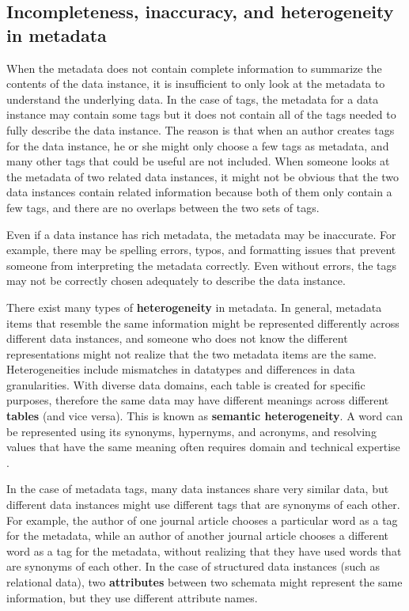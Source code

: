 \subsection{Incompleteness, inaccuracy, and heterogeneity in metadata}

When the metadata does not contain complete information to summarize the contents of the data instance, it is insufficient to only look at the metadata to understand the underlying data. In the case of tags, the metadata for a data instance may contain some tags but it does not contain all of the tags needed to fully describe the data instance. The reason is that when an author creates tags for the data instance, he or she might only choose a few tags as metadata, and many other tags that could be useful are not included. When someone looks at the metadata of two related data instances, it might not be obvious that the two data instances contain related information because both of them only contain a few tags, and there are no overlaps between the two sets of tags.

Even if a data instance has rich metadata, the metadata may be inaccurate. For example, there may be spelling errors, typos, and formatting issues that prevent someone from interpreting the metadata correctly. Even without errors, the tags may not be correctly chosen adequately to describe the data instance.

There exist many types of \textbf{\gls{heterogeneity}} in metadata. In general, metadata items that resemble the same information might be represented differently across different data instances, and someone who does not know the different representations might not realize that the two metadata items are the same. Heterogeneities include mismatches in datatypes and differences in data granularities. With diverse data domains, each table is created for specific purposes, therefore the same data may have different meanings across different \textbf{\glspl{table}} (and vice versa). This is known as \textbf{\gls{semantic heterogeneity}}. A word can be represented using its synonyms, hypernyms, and acronyms, and resolving values that have the same meaning often requires domain and technical expertise \cite{Halevy2005Why}.

In the case of metadata tags, many data instances share very similar data, but different data instances might use different tags that are synonyms of each other. For example, the author of one journal article chooses a particular word as a tag for the metadata, while an author of another journal article chooses a different word as a tag for the metadata, without realizing that they have used words that are synonyms of each other. In the case of structured data instances (such as relational data), two \textbf{\glspl{attribute}} between two schemata might represent the same information, but they use different attribute names.

